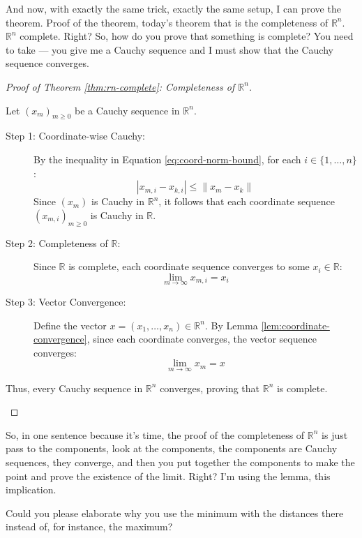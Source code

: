 \begin{spoken-clean}[00:25:20 - 00:26:35]
And now, with exactly the same trick, exactly the same setup, I can prove the theorem. Proof of the theorem, today's theorem that is the completeness of $\mathbb{R}^n$. $\mathbb{R}^n$ complete. Right? So, how do you prove that something is complete? You need to take --- you give me a Cauchy sequence and I must show that the Cauchy sequence converges.
\end{spoken-clean}

\begin{proof}[Proof of Theorem \ref{thm:rn-complete}: Completeness of \texorpdfstring{$\mathbb{R}^n$}{Rn}]
\begin{math-stroke}
Let $(x_m)_{m \ge 0}$ be a Cauchy sequence in $\mathbb{R}^n$.
\begin{description}
    \item[Step 1: Coordinate-wise Cauchy:] By the inequality in Equation \ref{eq:coord-norm-bound}, for each $i \in \{1, \dots, n\}$:
    \[ |x_{m,i} - x_{k,i}| \le \|x_m - x_k\| \]
    Since $(x_m)$ is Cauchy in $\mathbb{R}^n$, it follows that each coordinate sequence $(x_{m,i})_{m \ge 0}$ is Cauchy in $\mathbb{R}$.
    \item[Step 2: Completeness of $\mathbb{R}$:] Since $\mathbb{R}$ is complete, each coordinate sequence converges to some $x_i \in \mathbb{R}$:
    \[ \lim_{m \to \infty} x_{m,i} = x_i \]
    \item[Step 3: Vector Convergence:] Define the vector $x = (x_1, \dots, x_n) \in \mathbb{R}^n$. By Lemma \ref{lem:coordinate-convergence}, since each coordinate converges, the vector sequence converges:
    \[ \lim_{m \to \infty} x_m = x \]
\end{description}
Thus, every Cauchy sequence in $\mathbb{R}^n$ converges, proving that $\mathbb{R}^n$ is complete.
\end{math-stroke}
\end{proof}

\begin{spoken-clean}[00:26:35 - 00:28:08]
So, in one sentence because it's time, the proof of the completeness of $\mathbb{R}^n$ is just pass to the components, look at the components, the components are Cauchy sequences, they converge, and then you put together the components to make the point and prove the existence of the limit. Right? I'm using the lemma, this implication.
\end{spoken-clean}

\begin{student-interaction}
Could you please elaborate why you use the minimum with the distances there instead of, for instance, the maximum?
\end{student-interaction}

